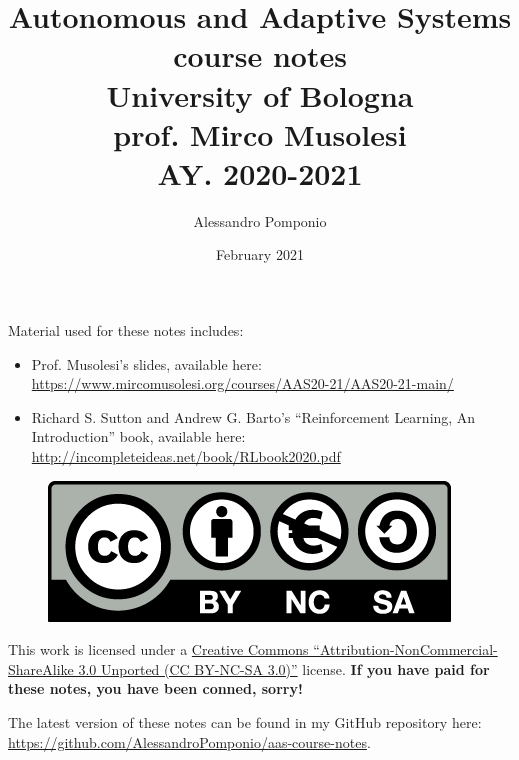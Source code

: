 \documentclass[12pt]{article}
\title{Autonomous and Adaptive Systems \\
        course notes\\
        University of Bologna \\
        \large	 prof. Mirco Musolesi \\
        AY. 2020-2021}
\author{Alessandro Pomponio}
\date{February 2021}
\newcommand\addemptypage{       %
    \null
    \thispagestyle{empty}
    \addtocounter{page}{-1}
    \newpage
    }
\begin{document}
\maketitle
\clearpage
\addemptypage


Material used for these notes includes:
\begin{itemize}
    \item Prof. Musolesi's slides, available here: \url{https://www.mircomusolesi.org/courses/AAS20-21/AAS20-21-main/}
    \item Richard S. Sutton and Andrew G. Barto's ``Reinforcement Learning, An Introduction'' book, available here: \url{http://incompleteideas.net/book/RLbook2020.pdf}
\end{itemize}

\begin{figure}
\centering
\includegraphics[width=.9\linewidth]{Images/by-nc-sa.eu.png}
\end{figure}

This work is licensed under a \href{https://creativecommons.org/licenses/by-nc-sa/3.0/}{Creative Commons ``Attribution-NonCommercial-ShareAlike 3.0 Unported (CC BY-NC-SA 3.0)''} license. \textbf{If you have paid for these notes, you have been conned, sorry!}

The latest version of these notes can be found in my GitHub repository here: \url{https://github.com/AlessandroPomponio/aas-course-notes}.

\clearpage

\tableofcontents
\clearpage
\addemptypage







\clearpage
\printbibliography
\end{document}
